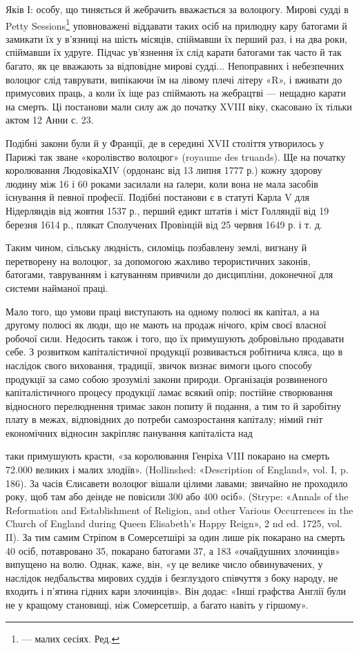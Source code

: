 Яків І: особу, що тиняється й жебрачить вважається за волоцюгу.
Мирові судді в Petty Sessions\footnote*{
— малих сесіях. Ред.
} уповноважені віддавати
таких осіб на прилюдну кару батогами й замикати їх у в’язниці
на шість місяців, спіймавши їх перший раз, і на два роки, спіймавши
їх удруге. Підчас ув’язнення їх слід карати батогами так часто
й так багато, як це вважають за відповідне мирові судді... Непоправних
і небезпечних волоцюг слід таврувати, випікаючи
їм на лівому плечі літеру «R», і вживати до примусових праць,
а коли їх іще раз спіймають на жебрацтві — нещадно карати
на смерть. Ці постанови мали силу аж до початку XVIII віку,
скасовано їх тільки актом 12 Анни с. 23.

Подібні закони були й у Франції, де в середині XVII століття
утворилось у Парижі так зване «королівство волоцюг»
(royaume des truands). Ще на початку королювання ЛюдовікаХІV
(ордонанс від 13 липня 1777 р.) кожну здорову людину між 16 і
60 роками засилали на ґалери, коли вона не мала засобів існування
й певної професії. Подібні постанови є в статуті Карла V
для Нідерляндів від жовтня 1537 р., перший едикт штатів і міст
Голляндії від 19 березня 1614 р., плякат Сполучених Провінцій
від 25 червня 1649 р. і т. д.

Таким чином, сільську людність, силоміць позбавлену землі,
вигнану й перетворену на волоцюг, за допомогою жахливо терористичних
законів, батогами, тавруванням і катуванням привчили
до дисципліни, доконечної для системи найманої праці.

Мало того, що умови праці виступають на одному полюсі як
капітал, а на другому полюсі як люди, що не мають на продаж
нічого, крім своєї власної робочої сили. Недосить також і того,
що їх примушують добровільно продавати себе. З розвитком капіталістичної
продукції розвивається робітнича кляса, що в наслідок
свого виховання, традиції, звичок визнає вимоги цього способу
продукції за само собою зрозумілі закони природи. Організація
розвиненого капіталістичного процесу продукції ламає
всякий опір; постійне створювання відносного перелюднення
тримає закон попиту й подання, а тим то й заробітну плату
в межах, відповідних до потреби самозростання капіталу; німий
гніт економічних відносин закріпляє панування капіталіста над

таки примушують красти, «за королювання Генріха VIII покарано на
смерть 72.000 великих і малих злодіїв». (Hollinshed: «Description of
England», vol. I, p. 186). За часів Єлисавети волоцюг вішали цілими лавами;
звичайно не проходило року, щоб там або деінде не повісили 300
або 400 осіб». (Strype: «Annals of the Reformation and Establishment
of Religion, and other Various Occurrences in the Church of England
during Queen Elisabeth’s Happy Reign», 2 nd ed. 1725, vol. II). За тим самим
Стріпом в Сомерсетшірі за один лише рік покарано на смерть 40 осіб,
потавровано 35, покарано батогами 37, а 183 «очайдушних злочинців»
випущено на волю. Однак, каже, він, «у це велике число обвинувачених,
у наслідок недбальства мирових суддів і безглуздого співчуття
з боку народу, не входить і п’ятина гідних кари злочинців». Він додає:
«Інші графства Англії були не у кращому становищі, ніж Сомерсетшір,
а багато навіть у гіршому».